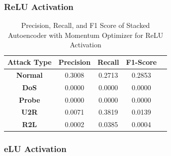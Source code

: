 \documentclass[12pt, a4paper]{report}
\begin{document}
\subsubsection{ReLU Activation}
\begin{table}[ht]
\centering
\captionsetup{justification=centering,margin=2cm}
\begin{tabular}{|c|c|c|c|c|}
\hline
\multicolumn{1}{|c|}{\textbf{Attack Type}} & \multicolumn{1}{c|}{\textbf{Precision}} & \multicolumn{1}{c|}{\textbf{Recall}} & \multicolumn{1}{c|}{\textbf{F1-Score}} \\ \hline
\textbf{Normal}        & 0.3008                                   & 0.2713                                & 0.2853                                                                  \\ \hline
\textbf{DoS}           & 0.0000                                  & 0.0000                                &  0.0000                                                                    \\ \hline
\textbf{Probe}         & 0.0000                                  & 0.0000                                & 0.0000                                                                  \\ \hline
\textbf{U2R}           & 0.0071                                    & 0.3819                                & 0.0139                                                                   \\ \hline
\textbf{R2L}           & 0.0002                                      & 0.0385                                   & 0.0004                                                            \\ \hline         \end{tabular}
\caption{Precision, Recall, and F1 Score of Stacked Autoencoder with Momentum Optimizer for ReLU Activation}
\label{prf1_mom_relu_auto}
\end{table}

\subsubsection{eLU Activation}
\end{document}
